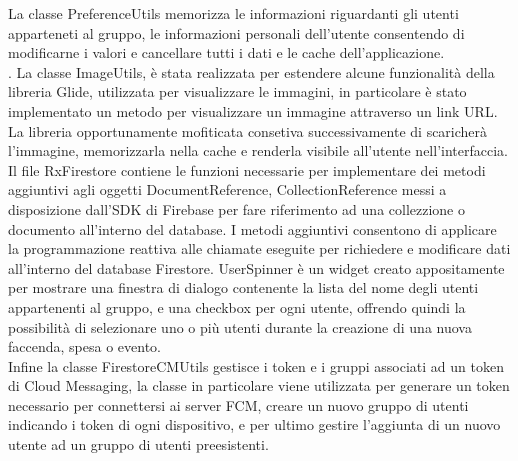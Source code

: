 La classe PreferenceUtils memorizza le informazioni riguardanti gli utenti apparteneti al gruppo, le informazioni personali dell'utente consentendo di modificarne i valori e cancellare tutti i dati e le cache dell'applicazione.\\.
La classe ImageUtils, è stata realizzata per estendere alcune funzionalità della libreria Glide, utilizzata per visualizzare le immagini, in particolare è stato implementato un metodo per visualizzare un immagine attraverso un link URL. La libreria opportunamente mofiticata consetiva successivamente di scaricherà l'immagine, memorizzarla nella cache e renderla visibile all'utente nell'interfaccia.\\
Il file RxFirestore contiene le funzioni necessarie per implementare dei metodi aggiuntivi agli oggetti DocumentReference, CollectionReference messi a disposizione dall'SDK di Firebase per fare riferimento ad una collezzione o documento all'interno del database. I metodi aggiuntivi consentono di applicare la programmazione reattiva alle chiamate eseguite per richiedere e modificare dati all'interno del database Firestore.
UserSpinner è un widget creato appositamente per mostrare una finestra di dialogo contenente la lista del nome degli utenti appartenenti al gruppo, e una checkbox per ogni utente, offrendo quindi la possibilità di selezionare uno o più utenti durante la creazione di una nuova faccenda, spesa o evento.\\
Infine la classe FirestoreCMUtils gestisce i token e i gruppi associati ad un token di Cloud Messaging, la classe in particolare viene utilizzata per generare un token necessario per connettersi ai server FCM, creare un nuovo gruppo di utenti indicando i token di ogni dispositivo, e per ultimo gestire l'aggiunta di un nuovo utente ad un gruppo di utenti preesistenti.

